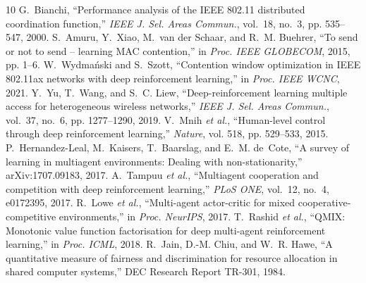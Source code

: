 \documentclass[conference]{IEEEtran}
\begin{document}
\begin{thebibliography}{10}
 G.~Bianchi, ``Performance analysis of the IEEE 802.11 distributed coordination function,'' \emph{IEEE J. Sel. Areas Commun.}, vol.~18, no.~3, pp. 535--547, 2000.
 S.~Amuru, Y.~Xiao, M.~van der Schaar, and R.~M. Buehrer, ``To send or not to send -- learning MAC contention,'' in \emph{Proc. IEEE GLOBECOM}, 2015, pp. 1--6.
 W.~Wydma\'nski and S.~Szott, ``Contention window optimization in IEEE 802.11ax networks with deep reinforcement learning,'' in \emph{Proc. IEEE WCNC}, 2021.
 Y.~Yu, T.~Wang, and S.~C. Liew, ``Deep-reinforcement learning multiple access for heterogeneous wireless networks,'' \emph{IEEE J. Sel. Areas Commun.}, vol.~37, no.~6, pp. 1277--1290, 2019.
 V.~Mnih \emph{et al.}, ``Human-level control through deep reinforcement learning,'' \emph{Nature}, vol. 518, pp. 529--533, 2015.
 P.~Hernandez-Leal, M.~Kaisers, T.~Baarslag, and E.~M. de~Cote, ``A survey of learning in multiagent environments: Dealing with non-stationarity,'' arXiv:1707.09183, 2017.
 A.~Tampuu \emph{et al.}, ``Multiagent cooperation and competition with deep reinforcement learning,'' \emph{PLoS ONE}, vol.~12, no.~4, e0172395, 2017.
 R.~Lowe \emph{et al.}, ``Multi-agent actor-critic for mixed cooperative-competitive environments,'' in \emph{Proc. NeurIPS}, 2017.
 T.~Rashid \emph{et al.}, ``QMIX: Monotonic value function factorisation for deep multi-agent reinforcement learning,'' in \emph{Proc. ICML}, 2018.
 R.~Jain, D.-M. Chiu, and W.~R. Hawe, ``A quantitative measure of fairness and discrimination for resource allocation in shared computer systems,'' DEC Research Report TR-301, 1984.
\end{thebibliography}
\end{document}
